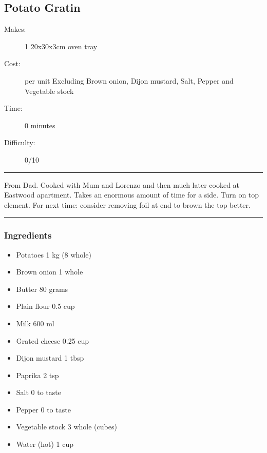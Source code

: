 \documentclass[]{article}
\begin{document}
\subsection*{\center\huge Potato Gratin}
\begin{description}
\item[Makes:] 1 20x30x3cm oven tray
\item[Cost:]  per unit Excluding Brown onion, Dijon mustard, Salt, Pepper and Vegetable stock
\item[Time:] 0 minutes
\item[Difficulty:] 0/10
\end{description}
\vspace{0.2cm}\hrule\vspace{0.5cm}
\begin{adjustwidth}{0.5 cm}{0.5 cm}

From Dad. Cooked with Mum and Lorenzo and then much later cooked at Eastwood apartment. Takes an enormous amount of time for a side. Turn on top element. For next time: consider removing foil at end to brown the top better. \hfill{}\color{black}

\end{adjustwidth}
\vspace{0.5cm}\hrule
\subsubsection*{\Large Ingredients}
\begin{multicols}{2}
\begin{itemize}
 \item Potatoes \hfill 1 kg (8 whole)
 \item Brown onion \hfill 1 whole
 \item Butter \hfill 80 grams
 \item Plain flour \hfill 0.5 cup
 \item Milk \hfill 600 ml
 \item Grated cheese \hfill 0.25 cup
 \item Dijon mustard \hfill 1 tbsp
 \item Paprika \hfill 2 tsp
 \item Salt \hfill 0 to taste
 \item Pepper \hfill 0 to taste
 \item Vegetable stock \hfill 3 whole (cubes)
 \item Water (hot) \hfill 1 cup
\end{itemize}
\end{multicols}
\end{document}
